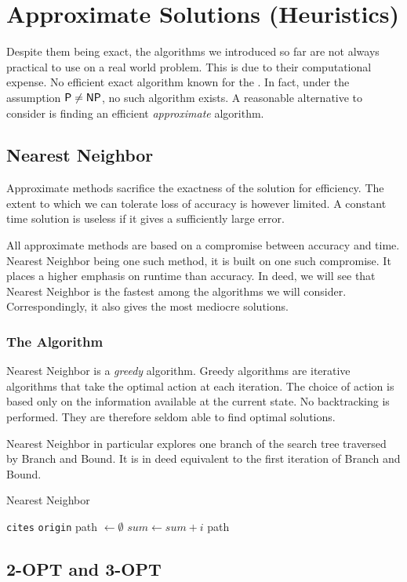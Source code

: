 \chapter{Approximate Solutions (Heuristics)}

Despite them being exact, the algorithms we introduced so far are not always practical to use on a real world problem. This is due to their computational expense. No efficient exact algorithm known for the \TSP. In fact, under the assumption \(\textsf{P}\neq\textsf{NP}\), no such algorithm exists. A reasonable alternative to consider is finding an efficient \emph{approximate} algorithm.

\section{Nearest Neighbor}

    Approximate methods sacrifice the exactness of the solution for efficiency. The extent to which we can tolerate loss of accuracy is however limited. A constant time solution is useless if it gives a sufficiently large error. 
    
    All approximate methods are based on a compromise between accuracy and time. Nearest Neighbor being one such method, it is built on one such compromise. It places a higher emphasis on runtime than accuracy. In deed, we will see that Nearest Neighbor is the fastest among the algorithms we will consider. Correspondingly, it also gives the most mediocre solutions.

    \subsection{The Algorithm}

    Nearest Neighbor is a \emph{greedy} algorithm. Greedy algorithms are iterative algorithms that take the optimal action at each iteration. The choice of action is based only on the information available at the current state. No backtracking is performed. They are therefore seldom able to find optimal solutions.

    Nearest Neighbor in particular explores one branch of the search tree traversed by Branch and Bound. It is in deed equivalent to the first iteration of Branch and Bound. 

    \begin{algorithm}
        \caption{Nearest Neighbor}
        \label{algo:nearest-neighbor}
        \begin{algorithmic}[1]
            \Require \texttt{cites} 
            \Require \texttt{origin} 
            \State path \(\gets \emptyset\) 
                \State $sum\gets sum+i$
            \EndFor
        \Ensure path
        \end{algorithmic}
    \end{algorithm}


    \section{2-OPT and 3-OPT}
